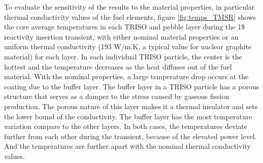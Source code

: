 \documentclass{elsarticle}
\begin{document}
To evaluate the sensitivity of the results to the material properties, in particular thermal conductivity values of the fuel elements, figure \ref{fig:temps_TMSR} shows the core average temperatures in each TRISO and pebble layer during the 1\$ reactivity insertion transient, with either nominal material properties or an uniform thermal conductivity (193 W/m.K, a typical value for nuclear graphite material) for each layer. 
In each individual TRISO particle, the center is the hottest and the temperature decreases as the heat diffuses out of the fuel material. With the nominal properties, a large temperature drop occurs at the coating due to the buffer layer. The buffer layer in a TRISO particle has a porous structure that serves as a damper to the stress caused by gaseous fission production. The porous nature of this layer makes it a thermal insulator and sets the lower bound of the conductivity. The buffer layer has the most temperature variation compare to the other layers.
In both cases, the temperatures deviate further from each other during the transient, because of the elevated power level. And the temperatures are further apart with the nominal thermal conductivity values.   
\end{document}
